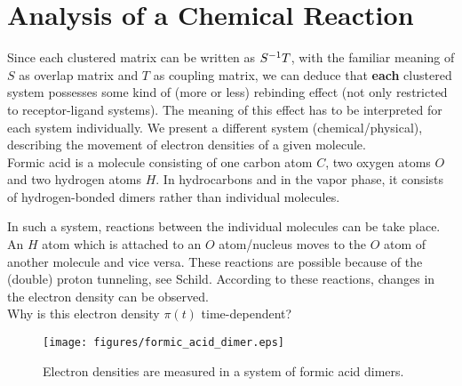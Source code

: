 \section{Analysis of a Chemical Reaction}

Since each clustered matrix can be written as $S^{-1} T$, with the familiar meaning of $S$ as overlap matrix and $T$ as coupling matrix, we can deduce that \textbf{each} clustered system possesses some kind of (more or less) rebinding effect (not only restricted to receptor-ligand systems).
The meaning of this effect has to be interpreted for each system individually.
We present a different system (chemical/physical), describing the movement of electron densities of a given molecule.
\\

Formic acid is a molecule consisting of one carbon atom $C$, two oxygen atoms $O$ and two hydrogen atoms $H$.
In hydrocarbons and in the vapor phase, it consists of hydrogen-bonded dimers rather than individual molecules. 

In such a system, reactions between the individual molecules can be take place. An $H$ atom which is attached to an $O$ atom/nucleus moves to the $O$ atom of another molecule and vice versa.
These reactions are possible because of the (double) proton tunneling, see Schild\cite[Chapter 4]{schild2013}.  %
According to these reactions, changes in the electron density can be observed. %
\\

Why is this electron density $\pi(t)$ time-dependent?   

\begin{figure}[!ht]
	\centering
	\texttt{[image: figures/formic\_acid\_dimer.eps]}
	\caption{Electron densities are measured in a system of formic acid dimers.}
	\label{fig:acid_dimer}
\end{figure}


